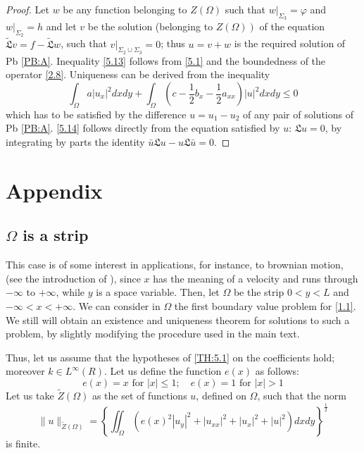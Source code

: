 \documentclass[a4paper,12pt,leqno]{article}
\numberwithin{equation}{section}
\begin{document}
\newpage

\begin{proof}
	Let $w$ be any function belonging to $Z(\Omega)$ such that $\left.w\right|_{\Sigma_{3}}=\varphi$ and $\left.w\right|_{\Sigma_{2}}=h$ and let $v$ be the solution (belonging to $\left.Z(\Omega)\right)$ of the equation $\tilde{\mathfrak{L}} v=f-\tilde{\mathfrak{L}} w$, such that $v|_{\Sigma_2 \cup \Sigma_{3}}=0$; thus $u=v+w$ is the required solution of Pb \ref{PB:A}. Inequality \eqref{5.13} follows from \eqref{5.1} and the boundedness of the operator \eqref{2.8}. Uniqueness can be derived from the inequality
	\begin{equation} \tag{5.14} \label{5.14}
		\int_{\Omega} a\left|u_{x}\right|^{2} d x d y+\int_{\Omega}\left(c-\frac{1}{2} b_{x}-\frac{1}{2} a_{xx}\right)|u|^{2} d x d y \leqslant 0
	\end{equation}
	which has to be satisfied by the difference $u=u_{1}-u_{2}$ of any pair of solutions of Pb \ref{PB:A}. \eqref{5.14} follows directly from the equation satisfied by $u$: $\mathfrak{L} u=0$, by integrating by parts the identity $\bar{u} \mathfrak{L} u -u \mathfrak{L} \bar{u}=0$.
\end{proof}


\appendix

\section{Appendix}

\renewcommand\thesubsection{\Roman{subsection}}

\subsection{\texorpdfstring{$\Omega$}{Omega} is a strip}

This case is of some interest in applications, for instance, to brownian motion, (see the introduction of \cite{zbMATH03479447}), since $x$ has the meaning of a velocity and runs through $-\infty$ to $+\infty$, while $y$ is a space variable. Then, let $\Omega$ be the strip $0<y<L$ and $-\infty<x<+\infty$. We can consider in $\Omega$ the first boundary value problem for \eqref{1.1}. We still will obtain an existence and uniqueness theorem for solutions to such a problem, by slightly modifying the procedure used in the main text.

Thus, let us assume that the hypotheses of \cref{TH:5.1} on the coefficients hold; moreover $k \in L^{\infty}(R)$. Let us define the function $e(x)$ as follows:
\begin{equation} \label{A1}
	e(x)=x \text { for }|x|\leqslant 1; \quad e(x)=1 \text { for }|x|>1
\end{equation}
Let us take $\tilde{Z}(\Omega)$ as the set of functions $u$, defined on $\Omega$, such that the norm
\begin{equation} \label{A2}
	\| u \|_{\tilde{Z}(\Omega)} =\left\{\iint_{\Omega}\left(e(x)^{2}\left|u_{y}\right|^{2}+\left|u_{xx}\right|^{2}+\left|u_{x}\right|^{2}+|u|^{2}\right) d x d y\right\}^{\frac 12}
\end{equation}
is finite.
\end{document}
